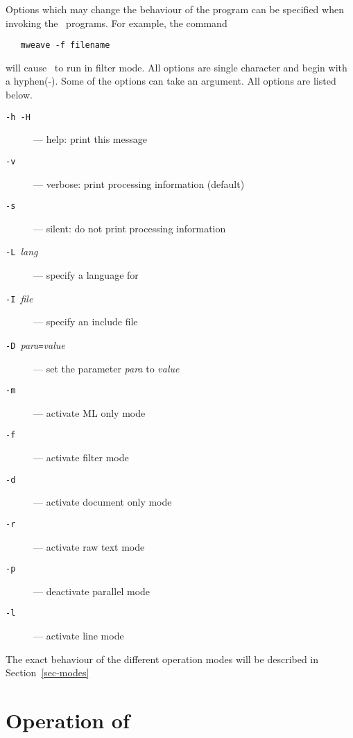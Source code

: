 Options which may change the behaviour of the program can be specified
when invoking the \mweb\ programs. For example,  the command
\begin{verbatim}
   mweave -f filename
\end{verbatim}
will cause \weave\ to run in filter mode. All options are single
character and begin with a hyphen(-). Some of the options can take an
argument. All options are listed below.
\begin{description}
\item[{\tt -h -H}] --- help: print this message
\item[{\tt -v}] --- verbose: print processing information (default)
\item[{\tt -s}] --- silent: do not print processing information
\item[{\tt -L\ }{\it lang\/}] --- specify a language for \tangle
\item[{\tt -I\ }{\it file\/}] --- specify an include file
\item[{\tt -D\ }{\it para\/}{\tt=}{\it value\/}] --- set the parameter {\it
para\/} to {\it value\/}
\item[{\tt -m}] --- activate ML only mode
\item[{\tt -f}] --- activate filter mode
\item[{\tt -d}] --- activate document only mode
\item[{\tt -r}] --- activate raw text mode
\item[{\tt -p}] --- deactivate parallel mode
\item[{\tt -l}] --- activate line mode
\end{description}
The exact behaviour of the different operation modes will be described
in Section~\ref{sec-modes}

\section{Operation of \mweb}

